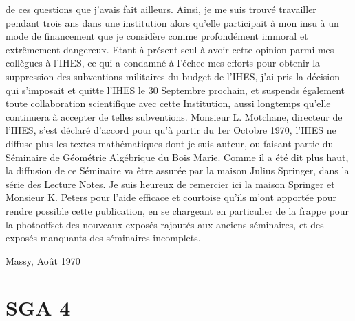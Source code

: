 \documentclass[11pt,a4paper]{article}
\begin{document}
de ces questions que j'avais fait ailleurs. Ainsi, je me suis trouvé travailler
pendant trois ans dans une institution alors qu'elle participait à mon insu à un
mode de financement que je considère comme profondément immoral et extrêmement
dangereux. Etant à présent seul à avoir cette opinion parmi mes collègues à
l'IHES, ce qui a condamné à l'échec mes efforts pour obtenir la suppression des
subventions militaires du budget de l'IHES, j'ai pris la décision qui s'imposait
et quitte l'IHES le 30 Septembre prochain, et suspends également toute
collaboration scientifique avec cette Institution, aussi longtemps qu'elle
continuera à accepter de telles subventions. Monsieur L. Motchane, directeur de
l'IHES, s'est déclaré d'accord pour qu'à partir du 1er Octobre 1970, l'IHES ne
diffuse plus les textes mathématiques dont je suis auteur, ou faisant partie du
Séminaire de Géométrie Algébrique du Bois Marie. Comme il a été dit plus haut,
la diffusion de ce Séminaire va être assurée par la maison Julius Springer, dans
la série des Lecture Notes. Je suis heureux de remercier ici la maison Springer
et Monsieur K. Peters pour l'aide efficace et courtoise qu'ils m'ont apportée
pour rendre possible cette publication, en se chargeant en particulier de la
frappe pour la photooffset des nouveaux exposés rajoutés aux anciens séminaires,
et des exposés manquants des séminaires incomplets.

Massy, Août 1970

\section*{SGA 4}


\end{document}
